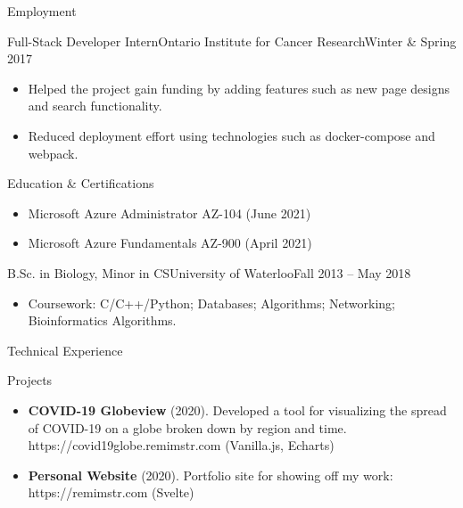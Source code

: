 \documentclass[]{mcdowellcv}
\begin{document}
\begin{cvsection}{Employment}
		\begin{cvsubsection}{Full-Stack Developer Intern}{Ontario Institute for Cancer Research}{Winter \& Spring 2017}
			\begin{itemize}
				\item Helped the project gain funding by adding features such as new page designs and search functionality.
				\item Reduced deployment effort using technologies such as docker-compose and webpack.
			\end{itemize}
		\end{cvsubsection}
	\end{cvsection}

	\begin{cvsection}{Education \& Certifications}
		\begin{cvsubsection}{}{}{}
			\begin{itemize}
			    \item Microsoft Azure Administrator AZ-104 (June 2021)
				\item Microsoft Azure Fundamentals AZ-900 (April 2021)
			\end{itemize}
		\end{cvsubsection}
		\begin{cvsubsection}{B.Sc. in Biology, Minor in CS}{University of Waterloo}{Fall 2013 -- May 2018}
			\begin{itemize}
				\item Coursework: C/C++/Python; Databases; Algorithms; Networking; Bioinformatics Algorithms.
			\end{itemize}
		\end{cvsubsection}
	\end{cvsection}

	\begin{cvsection}{Technical Experience}
		\begin{cvsubsection}{Projects}{}{}
			\begin{itemize}
				\item \textbf{COVID-19 Globeview} (2020). Developed a tool for visualizing the spread of COVID-19 on a globe broken down by region and time.
					https://covid19globe.remimstr.com (Vanilla.js, Echarts)
				\item \textbf{Personal Website} (2020). Portfolio site for showing off my work: https://remimstr.com (Svelte)
			\end{itemize}
		\end{cvsubsection}
	\end{cvsection}
\end{document}
